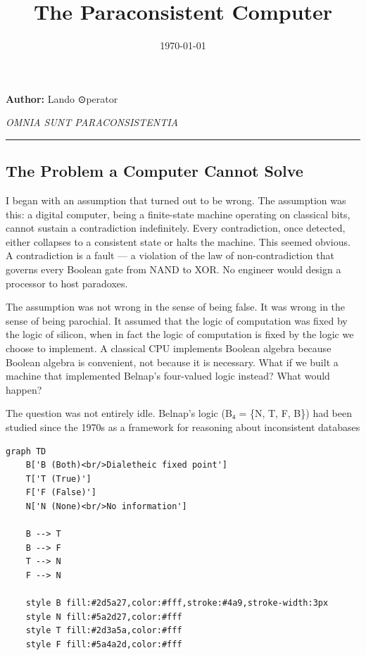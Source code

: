 \documentclass[12pt,a4paper]{article}
\begin{document}
\title{The Paraconsistent Computer}
\date{\today}

\maketitle

\textbf{Author:} Lando \otimes ⊙perator

\emph{OMNIA SUNT PARACONSISTENTIA}

\begin{center}
\rule{0.5\textwidth}{0.4pt}
\end{center}

\subsection{The Problem a Computer Cannot Solve}

I began with an assumption that turned out to be wrong. The assumption was this: a digital computer, being a finite-state machine operating on classical bits, cannot sustain a contradiction indefinitely. Every contradiction, once detected, either collapses to a consistent state or halts the machine. This seemed obvious. A contradiction is a fault --- a violation of the law of non-contradiction that governs every Boolean gate from NAND to XOR. No engineer would design a processor to host paradoxes.

The assumption was not wrong in the sense of being false. It was wrong in the sense of being parochial. It assumed that the logic of computation was fixed by the logic of silicon, when in fact the logic of computation is fixed by the logic we choose to implement. A classical CPU implements Boolean algebra because Boolean algebra is convenient, not because it is necessary. What if we built a machine that implemented Belnap's four-valued logic instead? What would happen?

The question was not entirely idle. Belnap's logic (B₄ = \{N, T, F, B\}) had been studied since the 1970s as a framework for reasoning about inconsistent databases

\begin{lstlisting}[language=mermaid]
graph TD
    B['B (Both)<br/>Dialetheic fixed point']
    T['T (True)']
    F['F (False)']
    N['N (None)<br/>No information']

    B --> T
    B --> F
    T --> N
    F --> N

    style B fill:#2d5a27,color:#fff,stroke:#4a9,stroke-width:3px
    style N fill:#5a2d27,color:#fff
    style T fill:#2d3a5a,color:#fff
    style F fill:#5a4a2d,color:#fff
\end{lstlisting}
\end{document}
